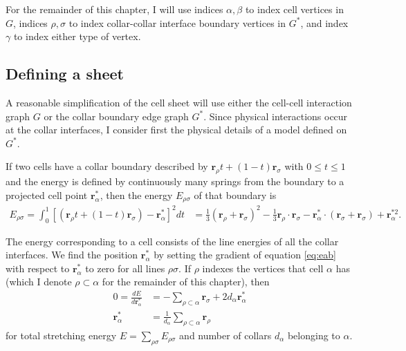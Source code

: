 For the remainder of this chapter, I will use indices $\alpha,\beta$ to index cell vertices in $G$, indices $\rho, \sigma$ to index collar-collar interface boundary vertices in $G^*$, and index $\gamma$ to index either type of vertex.

\subsection{Defining a sheet} \label{subsec:springs}

A reasonable simplification of the cell sheet will use either the cell-cell interaction graph $G$ or the collar boundary edge graph $G^*$. 
Since physical interactions occur at the collar interfaces, I consider first the physical details of a model defined on $G^*$. 

If two cells have a collar boundary described by $\bm{r}_\rho t + (1-t)\bm{r}_\sigma$ with $0 \leq t \leq 1$ and the energy is defined by continuously many springs from the boundary to a projected cell point $\bm{r}^*_\alpha$, then the energy $E_{\rho\sigma}$ of that boundary is 
 \begin{align}
     E_{\rho\sigma} = \int_0^1 \left[(\bm{r}_\rho t + (1-t)\bm{r}_\sigma) - \bm{r}^*_\alpha \right]^2 dt &= \frac{1}{3} (\bm{r}_\rho + \bm{r}_\sigma)^2 - \frac{1}{3} \bm{r}_\rho\cdot\bm{r}_\sigma - \bm{r}^*_\alpha \cdot (\bm{r}_\sigma + \bm{r}_\sigma) + \bm{r}^{*2}_\alpha. \label{eq:eab}
 \end{align}

The energy corresponding to a cell consists of the line energies of all the collar interfaces. 
We find the position $\bm{r}^*_\alpha$ by setting the gradient of equation \ref{eq:eab} with respect to $\bm{r}^*_\alpha$ to zero for all lines $\rho\sigma$. 
If $\rho$ indexes the vertices that cell $\alpha$ has (which I denote $\rho\subset\alpha$ for the remainder of this chapter), then 
\begin{align*}
    0 = \frac{dE}{d\bm{r}^*_\alpha} &= -\sum_{\rho\subset\alpha} \bm{r}_\sigma + 2d_\alpha\bm{r}^*_\alpha \\
    \bm{r}^*_\alpha &= \frac{1}{d_\alpha} \sum_{\rho\subset\alpha} \bm{r}_\rho
\end{align*}
\noindent for total stretching energy $E = \sum_{\rho\sigma}E_{\rho\sigma}$ and number of collars $d_\alpha$ belonging to $\alpha$.

